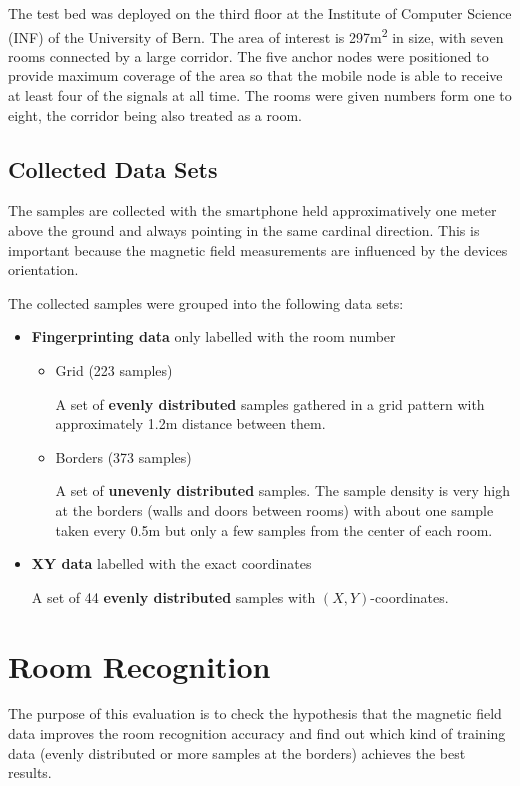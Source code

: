 The test bed was deployed on the third floor at the Institute of Computer Science (INF) of the University of Bern. The area of interest is 297m\textsuperscript{2} in size, with seven rooms connected by a large corridor. The five anchor nodes were positioned to provide maximum coverage of the area so that the mobile node is able to receive at least four of the signals at all time. The rooms were given numbers form one to eight, the corridor being also treated as a room.

\subsection{Collected Data Sets}

The samples are collected with the smartphone held approximatively one meter above the ground and always pointing in the same cardinal direction. This is important because the magnetic field measurements are influenced by the devices orientation.

The collected samples were grouped into the following data sets:

\begin{itemize}
\item \textbf{Fingerprinting data} only labelled with the room number
	\begin{itemize}
	\item Grid (223 samples)

	A set of \textbf{evenly distributed} samples gathered in a grid pattern with approximately 1.2m distance between them.
	\item Borders (373 samples)
	
	A set of \textbf{unevenly distributed} samples. The sample density is very high at the borders (walls and doors between rooms) with about one sample taken every 0.5m but only a few samples from the center of each room.
	\end{itemize}
 \item \textbf{XY data} labelled with the exact coordinates
 
 A set of 44 \textbf{evenly distributed} samples with \((X,Y)\)-coordinates.
\end{itemize}

\section{Room Recognition}
\label{EvaluationRoomRecognition}

The purpose of this evaluation is to check the hypothesis that the magnetic field data improves the room recognition accuracy and find out which kind of training data (evenly distributed or more samples at the borders) achieves the best results.

